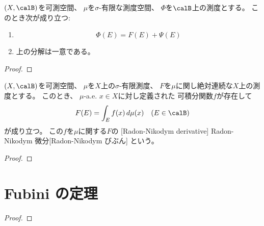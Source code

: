 \documentclass[report]{jlreq}
\begin{document}
\begin{proposition}[Lebesgue 分解]
    $(X, \calB)$を可測空間、
    $\mu$を$\sigma$-有限な測度空間、
    $\Phi$を$\calB$上の測度とする。
    このとき次が成り立つ:
    \begin{enumerate}
        \item \TODO{}
            \begin{equation}
                \Phi(E) = F(E) + \Psi(E)
            \end{equation}
        \item 上の分解は一意である。
    \end{enumerate}
\end{proposition}

\begin{proof}
    \TODO{}
\end{proof}

\begin{theorem}
    $(X, \calB)$を可測空間、
    $\mu$を$X$上の$\sigma$-有限測度、
    $F$を$\mu$に関し絶対連続な$X$上の測度とする。
    このとき、
    $\mu$-a.e. $x \in X$に対し定義された
    可積分関数$f$が存在して
    \begin{equation}
        F(E) = \int_E f(x) \, d\mu(x)
            \quad
            (E \in \calB)
    \end{equation}
    が成り立つ。
    この$f$を$\mu$に関する$F$の
    [Radon-Nikodym derivative]
        {Radon-Nikodym 微分}[Radon-Nikodym びぶん]
    という。
\end{theorem}

\begin{proof}
    \TODO{}
\end{proof}

%
\section{Fubini の定理}

\begin{theorem}
    \TODO{}
\end{theorem}

\begin{proof}
    \TODO{}
\end{proof}



%
\end{document}
